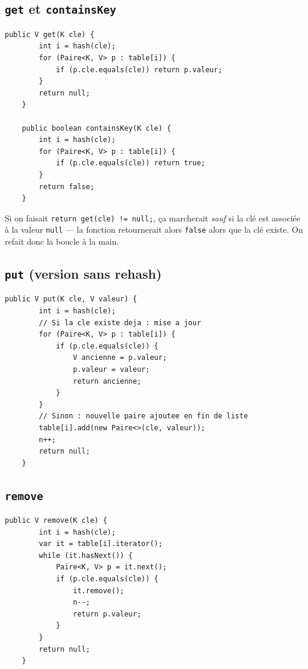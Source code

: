 \documentclass[11pt,a4paper]{article}
\begin{document}
\subsection{\texttt{get} et \texttt{containsKey}}

\begin{lstlisting}[style=java]
    public V get(K cle) {
        int i = hash(cle);
        for (Paire<K, V> p : table[i]) {
            if (p.cle.equals(cle)) return p.valeur;
        }
        return null;
    }

    public boolean containsKey(K cle) {
        int i = hash(cle);
        for (Paire<K, V> p : table[i]) {
            if (p.cle.equals(cle)) return true;
        }
        return false;
    }
\end{lstlisting}

\begin{attentionbox}
Si on faisait \texttt{return get(cle) != null;}, ça marcherait \emph{sauf} si la clé est associée à la valeur \texttt{null} --- la fonction retournerait alors \texttt{false} alors que la clé existe. On refait donc la boucle à la main.
\end{attentionbox}

\subsection{\texttt{put} (version sans rehash)}

\begin{lstlisting}[style=java]
    public V put(K cle, V valeur) {
        int i = hash(cle);
        // Si la cle existe deja : mise a jour
        for (Paire<K, V> p : table[i]) {
            if (p.cle.equals(cle)) {
                V ancienne = p.valeur;
                p.valeur = valeur;
                return ancienne;
            }
        }
        // Sinon : nouvelle paire ajoutee en fin de liste
        table[i].add(new Paire<>(cle, valeur));
        n++;
        return null;
    }
\end{lstlisting}

\subsection{\texttt{remove}}

\begin{lstlisting}[style=java]
    public V remove(K cle) {
        int i = hash(cle);
        var it = table[i].iterator();
        while (it.hasNext()) {
            Paire<K, V> p = it.next();
            if (p.cle.equals(cle)) {
                it.remove();
                n--;
                return p.valeur;
            }
        }
        return null;
    }
\end{lstlisting}
\end{document}

